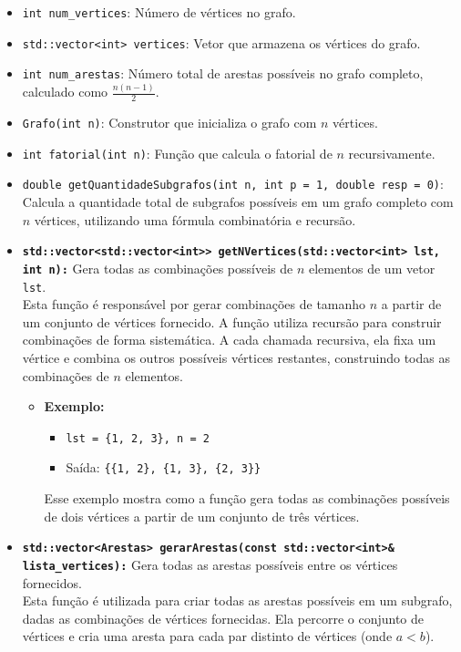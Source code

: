 \documentclass{article}
\begin{document}
\begin{itemize}
    \item \texttt{int num\_vertices}: Número de vértices no grafo.
    \item \texttt{std::vector<int> vertices}: Vetor que armazena os vértices do grafo.
    \item \texttt{int num\_arestas}: Número total de arestas possíveis no grafo completo, calculado como \(\frac{n(n-1)}{2}\).
    
    \item \texttt{Grafo(int n)}: Construtor que inicializa o grafo com \( n \) vértices.
    \item \texttt{int fatorial(int n)}: Função que calcula o fatorial de \( n \) recursivamente.
    
    \item \texttt{double getQuantidadeSubgrafos(int n, int p = 1, double resp = 0)}: Calcula a quantidade total de subgrafos possíveis em um grafo completo com \( n \) vértices, utilizando uma fórmula combinatória e recursão.

    \item \textbf{\texttt{std::vector<std::vector<int>> getNVertices(std::vector<int> lst, int n):}} Gera todas as combinações possíveis de \( n \) elementos de um vetor \texttt{lst}. \\
    Esta função é responsável por gerar combinações de tamanho \( n \) a partir de um conjunto de vértices fornecido. A função utiliza recursão para construir combinações de forma sistemática. A cada chamada recursiva, ela fixa um vértice e combina os outros possíveis vértices restantes, construindo todas as combinações de \( n \) elementos.
    
    \begin{itemize}
        \item \textbf{Exemplo:} 
        \begin{itemize}
            \item \texttt{lst = \{1, 2, 3\}, n = 2} 
            \item Saída: \texttt{\{\{1, 2\}, \{1, 3\}, \{2, 3\}\}} 
        \end{itemize}
        Esse exemplo mostra como a função gera todas as combinações possíveis de dois vértices a partir de um conjunto de três vértices.
    \end{itemize}

    \item \textbf{\texttt{std::vector<Arestas> gerarArestas(const std::vector<int>\& lista\_vertices):}} Gera todas as arestas possíveis entre os vértices fornecidos. \\
    Esta função é utilizada para criar todas as arestas possíveis em um subgrafo, dadas as combinações de vértices fornecidas. Ela percorre o conjunto de vértices e cria uma aresta para cada par distinto de vértices (onde \( a < b \)).


\end{itemize}
\end{document}
